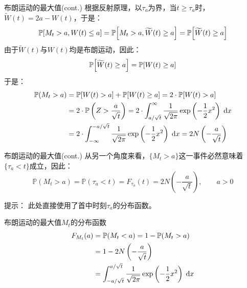 \documentclass[t]{beamer}
\newcommand{\dif}{{\;\rm d}}
\renewcommand{\Pr}{\mathbb{P}}
\begin{document}
\begin{frame}{布朗运动的最大值(cont.)}
  根据反射原理，以$\tau_a$为界，当$t\ge \tau_a$时，$\widetilde{W}(t)=2a-W(t)$，于是：
  \begin{equation*}
  \Pr\qty[M_t>a, W(t)\le a]=\Pr\qty[M_t>a,\widetilde W(t)\ge a]=\Pr\qty[\widetilde W(t)\ge a]
  \end{equation*}
  由于$\widetilde W(t)$与$W(t)$均是布朗运动，因此：
  \[\Pr\qty[\widetilde W(t)\ge a]=\Pr\qty[W(t)\ge a] \]
  于是：
  \begin{equation*}
  \begin{split}
  \Pr(M_t>a)&=\Pr\qty[W(t)>a]+\Pr\qty[W(t)\ge a]=2\cdot\Pr\qty[W(t)> a]\\
  &=2\cdot \Pr\left(Z>\frac{a}{\sqrt{t}}\right)=2\cdot \int_{a/\sqrt{t}}^{\infty} \frac{1}{\sqrt{2\pi}}\exp\left(-\frac{1}{2}x^2\right)\dif x \\
  &=2\cdot \int^{-a/\sqrt{t}}_{-\infty} \frac{1}{\sqrt{2\pi}}\exp\left(-\frac{1}{2}x^2\right)\dif x=2N\left( -\frac{a}{\sqrt{t}}\right) 
  \end{split}
  \end{equation*}
\end{frame}


\begin{frame}{布朗运动的最大值(cont.)}
    从另一个角度来看，$\{M_t>a\}$这一事件必然意味着$\{\tau_a<t\}$成立，因此：
    \begin{equation*}
    \Pr(M_t>a)=\Pr(\tau_a<t)=F_{\tau_a}(t)=2N\left( -\frac{a}{\sqrt{t}}\right) ,\qquad a>0
    \end{equation*}

    \begin{block}{提示：}
      此处直接使用了首中时刻$\tau_a$的分布函数。
    \end{block}
\end{frame}



\begin{frame}{布朗运动的最大值$M_t$的分布函数}
    \[\begin{split}
      F_{M_t}(a)&=\Pr(M_t<a)=1-\Pr(M_t>a)\\
      &=1-2N\left( -\frac{a}{\sqrt{t}}\right)\\
      &=\int^{a/\sqrt{t}}_{-a/\sqrt{t}}\frac{1}{\sqrt{2\pi}}\exp\left(-\frac{1}{2}x^2\right)\dif x
      \end{split}\]
\end{frame}
\end{document}
